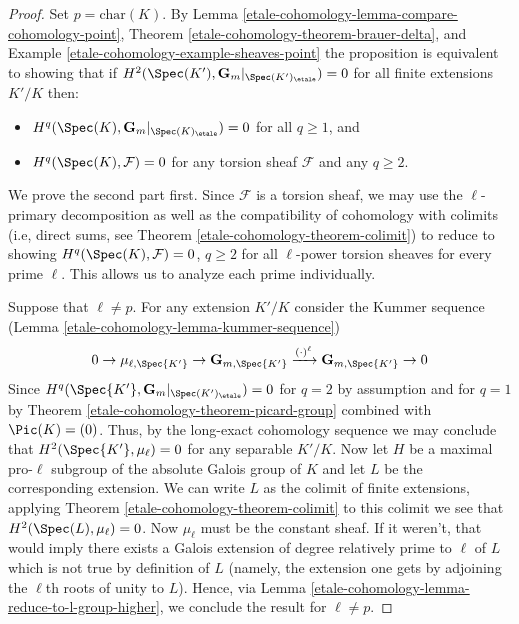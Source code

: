 \begin{proof}
Set $p = \text{char}(K)$.
By Lemma \ref{etale-cohomology-lemma-compare-cohomology-point},
Theorem \ref{etale-cohomology-theorem-brauer-delta},
and Example \ref{etale-cohomology-example-sheaves-point}
the proposition is equivalent to showing that if
$H^2(\Spec(K'),\mathbf{G}_m|_{\Spec(K')_\etale}) = 0$
for all finite extensions $K'/K$ then:
\begin{itemize}
\item $H^q(\Spec(K),\mathbf{G}_m|_{\Spec(K)_\etale}) = 0$
for all $q \geq 1$, and
\item $H^q(\Spec(K),\mathcal{F}) = 0$
for any torsion sheaf $\mathcal{F}$ and any $q \geq 2$.
\end{itemize}
We prove the second part first.
Since $\mathcal{F}$ is a torsion sheaf, we may use the
$\ell$-primary decomposition as well as the compatibility of
cohomology with colimits (i.e, direct sums, see Theorem \ref{etale-cohomology-theorem-colimit})
to reduce to showing  $H^q(\Spec(K),\mathcal{F}) = 0$, $q \geq 2$
for all $\ell$-power torsion sheaves for every prime $\ell$. This
allows us to analyze each prime individually.

\medskip\noindent
Suppose that $\ell \neq p$. For any extension $K'/K$
consider the Kummer sequence (Lemma \ref{etale-cohomology-lemma-kummer-sequence})
$$
0 \to
\mu_{\ell, \Spec{K'}} \to
\mathbf{G}_{m, \Spec{K'}} \xrightarrow{(\cdot)^{\ell}}
\mathbf{G}_{m, \Spec{K'}} \to 0
$$
Since $H^q(\Spec{K'},\mathbf{G}_m|_{\Spec(K')_\etale}) = 0$
for $q = 2$ by assumption  and for $q = 1$ by
Theorem \ref{etale-cohomology-theorem-picard-group} combined with
$\Pic(K) = (0)$. Thus, by the long-exact cohomology
sequence we may conclude that $H^2(\Spec{K'}, \mu_\ell) = 0$ for
any separable $K'/K$. Now let $H$ be a maximal pro-$\ell$ subgroup
of the absolute Galois group of $K$ and let $L$ be the
corresponding extension. We can write $L$ as the colimit of finite extensions,
applying Theorem \ref{etale-cohomology-theorem-colimit} to this colimit we see that
$H^2(\Spec(L), \mu_\ell) = 0$.
Now $\mu_\ell$ must be the constant sheaf. If it weren't, that would imply
there exists a Galois extension of degree relatively prime to
$\ell$ of $L$ which is not true by definition of $L$ (namely, the extension
one gets by adjoining the  $\ell$th roots of unity to $L$).
Hence, via Lemma \ref{etale-cohomology-lemma-reduce-to-l-group-higher},
we conclude the result for $\ell \neq p$.


\end{proof}
